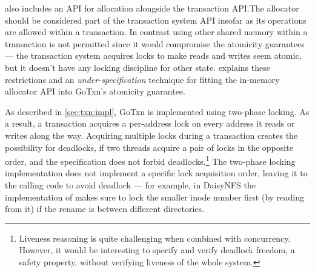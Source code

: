  also includes an API for allocation alongside the transaction
API.\@ The allocator should be considered part of the transaction system API
insofar as its operations are allowed within a transaction. In contrast using
other shared memory within a transaction is not permitted since it would
compromise the atomicity guarantees --- the transaction system acquires locks to
make reads and writes seem atomic, but it doesn't have any locking discipline
for other state.  explains these restrictions and an
\emph{under-specification} technique for fitting the
in-memory allocator API into GoTxn's atomicity guarantee.



As described in \cref{sec:txn:impl}, GoTxn is implemented using two-phase
locking. As a result, a transaction acquires a per-address lock on every address
it reads or writes along the way. Acquiring multiple locks during a transaction
creates the possibility for deadlocks, if two threads acquire a pair of locks in
the opposite order, and the specification does not forbid
deadlocks.\footnote{Liveness reasoning is quite challenging when
combined with concurrency. However, it would be interesting to specify and
verify deadlock freedom, a safety property, without verifying liveness of the
whole system.} The two-phase locking
implementation does not implement a specific lock acquisition order, leaving it
to the calling code to avoid deadlock --- for example, in DaisyNFS the
implementation of  makes sure to lock the smaller inode number first
(by reading from it) if the rename is between different directories.
